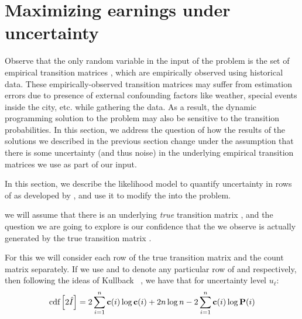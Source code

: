 

\section{Maximizing earnings under uncertainty}
\label{sec:sensitivity}
Observe that the only random variable in the input of the {\originalproblem} problem
is the set of empirical transition matrices {\empiricaltransitionmatrix}, which are empirically
observed using historical data. These empirically-observed transition matrices may suffer from estimation errors due to presence of external confounding factors like weather, special events inside the city, etc. while gathering the data. As a result, the dynamic programming solution to the {\originalproblem} problem
may also be sensitive to the transition probabilities. In this section, we
address the question of how the results of the solutions we described in the previous section change under the assumption that there is some uncertainty (and thus noise) in
the underlying empirical transition matrices we use as part of our input.

In this section, we describe the likelihood model to quantify uncertainty in rows of {\empiricaltransitionmatrix} as developed by \citet{nilim2004robustness}, and use it to modify the {\originalproblem} into the {\robustproblem} problem.



 
we will assume that there is an underlying \emph{true} transition matrix
{\truetransitionmatrix}, and the question we are going to explore is 
our confidence that the
{\countmatrix} we observe is actually 
generated by the true transition matrix {\truetransitionmatrix}.

For this we will consider each row of the true transition matrix and the count matrix
separately. If we use {\rowtruetransitionmatrix} and {\rowcountmatrix} to denote
any particular row of {\truetransitionmatrix} and {\countmatrix} respectively, then 
following the ideas of Kullback {\etal}~\cite{kullback62tests}, we have that 
for uncertainty level $u_\ell$:
\[
\text{cdf}\left[2\hat{I}\right] =  2\sum_{i=1}^n{\mathbf{c}}(i)\log{\mathbf{c}}(i)+2n\log n -2\sum_{i=1}^n{\mathbf{c}}(i)\log{\ensuremath{\mathbf{P}}}(i) 
\]

